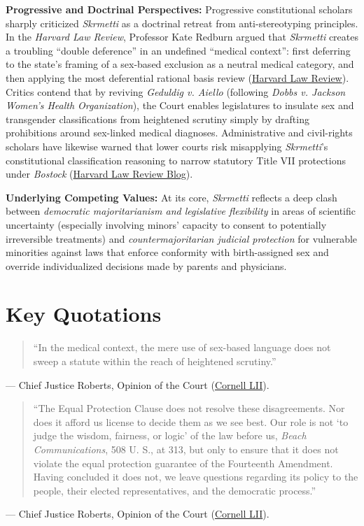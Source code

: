 \documentclass[12pt]{article}
\begin{document}
\textbf{Progressive and Doctrinal Perspectives:} Progressive constitutional scholars sharply criticized \textit{Skrmetti} as a doctrinal retreat from anti-stereotyping principles. In the \textit{Harvard Law Review}, Professor Kate Redburn argued that \textit{Skrmetti} creates a troubling ``double deference'' in an undefined ``medical context'': first deferring to the state's framing of a sex-based exclusion as a neutral medical category, and then applying the most deferential rational basis review (\href{https://harvardlawreview.org/print/vol-139/skrmetti-beyond-scrutiny/}{Harvard Law Review}). Critics contend that by reviving \textit{Geduldig v. Aiello} (following \textit{Dobbs v. Jackson Women's Health Organization}), the Court enables legislatures to insulate sex and transgender classifications from heightened scrutiny simply by drafting prohibitions around sex-linked medical diagnoses. Administrative and civil-rights scholars have likewise warned that lower courts risk misapplying \textit{Skrmetti}'s constitutional classification reasoning to narrow statutory Title VII protections under \textit{Bostock} (\href{https://harvardlawreview.org/blog/2026/04/intermediary-choice-and-the-structural-logic-of-title-viis-but-for-test/}{Harvard Law Review Blog}).

\textbf{Underlying Competing Values:} At its core, \textit{Skrmetti} reflects a deep clash between \textit{democratic majoritarianism and legislative flexibility} in areas of scientific uncertainty (especially involving minors' capacity to consent to potentially irreversible treatments) and \textit{countermajoritarian judicial protection} for vulnerable minorities against laws that enforce conformity with birth-assigned sex and override individualized decisions made by parents and physicians.

\section{Key Quotations}

\begin{quote}
``In the medical context, the mere use of sex-based language does not sweep a statute within the reach of heightened scrutiny.''
\end{quote}
\noindent --- Chief Justice Roberts, Opinion of the Court (\href{https://www.law.cornell.edu/supremecourt/text/23-477}{Cornell LII}).

\begin{quote}
``The Equal Protection Clause does not resolve these disagreements. Nor does it afford us license to decide them as we see best. Our role is not `to judge the wisdom, fairness, or logic' of the law before us, \textit{Beach Communications}, 508 U. S., at 313, but only to ensure that it does not violate the equal protection guarantee of the Fourteenth Amendment. Having concluded it does not, we leave questions regarding its policy to the people, their elected representatives, and the democratic process.''
\end{quote}
\noindent --- Chief Justice Roberts, Opinion of the Court (\href{https://www.law.cornell.edu/supremecourt/text/23-477}{Cornell LII}).
\end{document}

